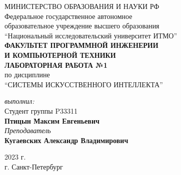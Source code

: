 
\begin{center}
	МИНИСТЕРСТВО ОБРАЗОВАНИЯ И НАУКИ РФ\\
	\hfill \break
	Федеральное государственное автономное\\
	образовательное учреждение высшего образования\\
	``Национальный исследовательский университет ИТМО''\\
	\hfill \break
	\textbf{ФАКУЛЬТЕТ ПРОГРАММНОЙ ИНЖЕНЕРИИ \\
	И КОМПЬЮТЕРНОЙ ТЕХНИКИ}\\
	\vspace{2cm}
	\large{\textbf{ЛАБОРАТОРНАЯ РАБОТА №1}}\\
	\hfill \break
	по дисциплине\\
		\large{``СИСТЕМЫ ИСКУССТВЕННОГО ИНТЕЛЛЕКТА''}\\
	\hfill \break
\end{center}
\begin{flushright}
	\vspace{3cm}
	\textit{выполнил:}\\
	Студент группы P33311\\
	\textbf{Птицын Максим Евгеньевич}\\
	\textit{Преподаватель}\\
	\textbf{Кугаевских Александр Владимирович}
\end{flushright}
\vspace{5cm}
\begin{center}
	2023 г.\\
	г. Санкт-Петербург
\end{center}
\thispagestyle{empty}
\newpage
